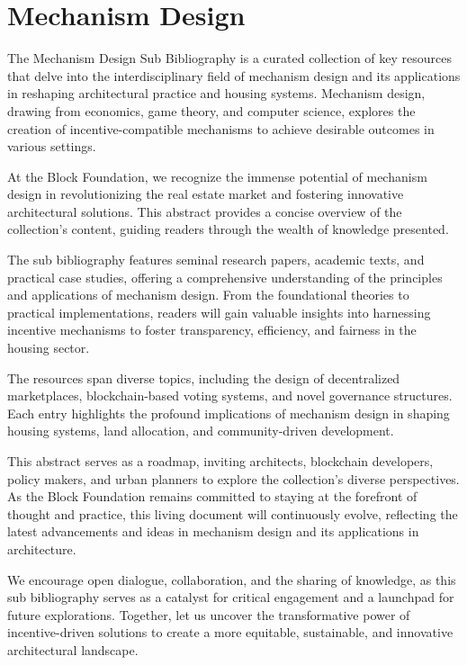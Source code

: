 \newpage
\section{Mechanism Design}

The Mechanism Design Sub Bibliography is a curated collection of key resources that delve into the interdisciplinary field of mechanism design and its applications in reshaping architectural practice and housing systems. Mechanism design, drawing from economics, game theory, and computer science, explores the creation of incentive-compatible mechanisms to achieve desirable outcomes in various settings.

At the Block Foundation, we recognize the immense potential of mechanism design in revolutionizing the real estate market and fostering innovative architectural solutions. This abstract provides a concise overview of the collection's content, guiding readers through the wealth of knowledge presented.

The sub bibliography features seminal research papers, academic texts, and practical case studies, offering a comprehensive understanding of the principles and applications of mechanism design. From the foundational theories to practical implementations, readers will gain valuable insights into harnessing incentive mechanisms to foster transparency, efficiency, and fairness in the housing sector.

The resources span diverse topics, including the design of decentralized marketplaces, blockchain-based voting systems, and novel governance structures. Each entry highlights the profound implications of mechanism design in shaping housing systems, land allocation, and community-driven development.

This abstract serves as a roadmap, inviting architects, blockchain developers, policy makers, and urban planners to explore the collection's diverse perspectives. As the Block Foundation remains committed to staying at the forefront of thought and practice, this living document will continuously evolve, reflecting the latest advancements and ideas in mechanism design and its applications in architecture.

We encourage open dialogue, collaboration, and the sharing of knowledge, as this sub bibliography serves as a catalyst for critical engagement and a launchpad for future explorations. Together, let us uncover the transformative power of incentive-driven solutions to create a more equitable, sustainable, and innovative architectural landscape.




